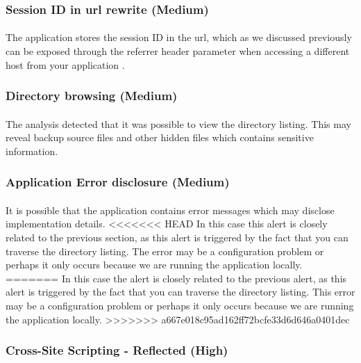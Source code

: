 \documentclass[11pt,english,a4paper]{report}
\begin{document}
\subsubsection{Session ID in \gls{url} rewrite (Medium)}
\paragraph{}
The application stores the session ID in the \gls{url}, which as we discussed previously can be exposed through the referrer header parameter when accessing a different host from your application \cite{url-sessionid-risks}.

\subsubsection{Directory browsing (Medium)}
\paragraph{}
The analysis detected that it was possible to view the directory listing.
This may reveal backup source files and other hidden files which contains sensitive information.

\subsubsection{Application Error disclosure (Medium)}
\paragraph{}
It is possible that the application contains error messages which may disclose implementation details. 
<<<<<<< HEAD
In this case this alert is closely related to the previous section, as this alert is triggered by the fact that you can traverse the directory listing. 
The error may be a configuration problem or perhaps it only occurs because we are running the application locally.
=======
In this case the alert is closely related to the previous alert, as this alert is triggered by the fact that you can traverse the directory listing. 
This error may be a configuration problem or perhaps it only occurs because we are running the application locally.
>>>>>>> a667e018c95ad162ff72bcfe33d6d646a0401dec

\subsubsection{Cross-Site Scripting - Reflected (High)}
\end{document}

